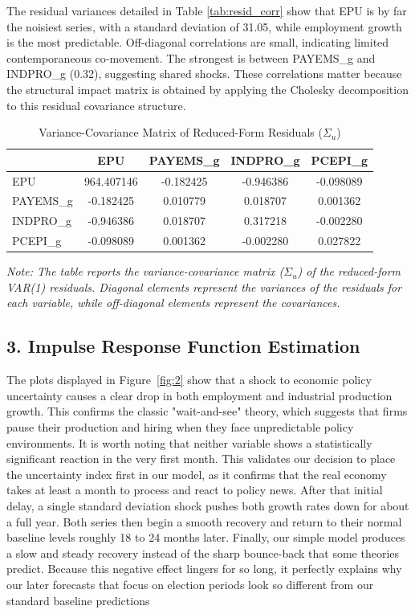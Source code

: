 \documentclass[11pt]{article}
\begin{document}
The residual variances detailed in Table \ref{tab:resid_corr} show that EPU is by far the noisiest series, with a standard deviation of 31.05, 
while employment growth is the most predictable. Off‑diagonal correlations are small, indicating limited 
contemporaneous co‑movement. The strongest is between PAYEMS\_g and INDPRO\_g (0.32), suggesting shared 
shocks. These correlations matter because the structural impact matrix is obtained by applying the Cholesky 
decomposition to this residual covariance structure.


\begin{table}[H]
\centering
\caption{Variance-Covariance Matrix of Reduced-Form Residuals ($\Sigma_u$)}
\label{tab:resid_cov}
\begin{tabular}{lcccc}
\hline
            & EPU        & PAYEMS\_g  & INDPRO\_g  & PCEPI\_g  \\
\hline
EPU         & 964.407146 & -0.182425  & -0.946386  & -0.098089 \\
PAYEMS\_g   & -0.182425  & 0.010779   & 0.018707   & 0.001362  \\
INDPRO\_g   & -0.946386  & 0.018707   & 0.317218   & -0.002280 \\
PCEPI\_g    & -0.098089  & 0.001362   & -0.002280  & 0.027822  \\
\hline
\end{tabular}
\begin{flushleft}
\footnotesize \textit{Note: The table reports the variance-covariance matrix ($\Sigma_u$) of the reduced-form VAR(1) residuals. Diagonal elements represent the variances of the residuals for each variable, while off-diagonal elements represent the covariances.}
\end{flushleft}
\end{table}

\subsection*{3. Impulse Response Function Estimation}

The plots displayed in Figure~\ref{fig:2} show that a shock to economic policy uncertainty causes a clear drop in both employment and industrial 
production growth. This confirms the classic "wait-and-see" theory, which suggests that firms pause their production and 
hiring when they face unpredictable policy environments. It is worth noting that neither variable shows a statistically 
significant reaction in the very first month. This validates our decision to place the uncertainty index first in our model, 
as it confirms that the real economy takes at least a month to process and react to policy news. After that initial delay, a 
single standard deviation shock pushes both growth rates down for about a full year. Both series then begin a smooth recovery 
and return to their normal baseline levels roughly 18 to 24 months later. Finally, our simple model produces a slow and steady 
recovery instead of the sharp bounce-back that some theories predict. Because this negative effect lingers for so long, it 
perfectly explains why our later forecasts that focus on election periods look so different from our standard baseline predictions
\end{document}
